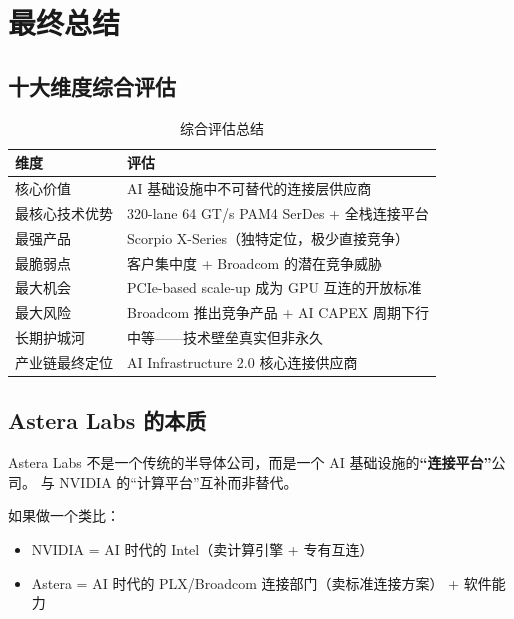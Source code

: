 
\section{最终总结}

\subsection{十大维度综合评估}

\begin{table}[htb]
    \centering
    \caption{综合评估总结}
    \label{tab:final-assessment}
    \begin{tabular}{lp{}}
        \toprule
        \textbf{维度} & \textbf{评估} \\
        \midrule
        \rowcolor{darkgreen!10}
        核心价值 & AI 基础设施中不可替代的连接层供应商 \\
        \rowcolor{darkgreen!10}
        最核心技术优势 & 320-lane 64 GT/s PAM4 SerDes + 全栈连接平台 \\
        \rowcolor{darkgreen!5}
        最强产品 & Scorpio X-Series（独特定位，极少直接竞争） \\
        \rowcolor{orange!10}
        最脆弱点 & 客户集中度 + Broadcom 的潜在竞争威胁 \\
        \rowcolor{darkgreen!5}
        最大机会 & PCIe-based scale-up 成为 GPU 互连的开放标准 \\
        \rowcolor{red!10}
        最大风险 & Broadcom 推出竞争产品 + AI CAPEX 周期下行 \\
        \rowcolor{yellow!10}
        长期护城河 & 中等——技术壁垒真实但非永久 \\
        \rowcolor{blue!5}
        产业链最终定位 & AI Infrastructure 2.0 核心连接供应商 \\
        \bottomrule
    \end{tabular}
\end{table}

\subsection{Astera Labs 的本质}

Astera Labs 不是一个传统的半导体公司，而是一个 AI 基础设施的\textbf{``连接平台''}公司。
与 NVIDIA 的``计算平台''互补而非替代。

如果做一个类比：
\begin{itemize}
    \item NVIDIA = AI 时代的 Intel（卖计算引擎 + 专有互连）
    \item Astera = AI 时代的 PLX/Broadcom 连接部门（卖标准连接方案） + 软件能力
\end{itemize}

